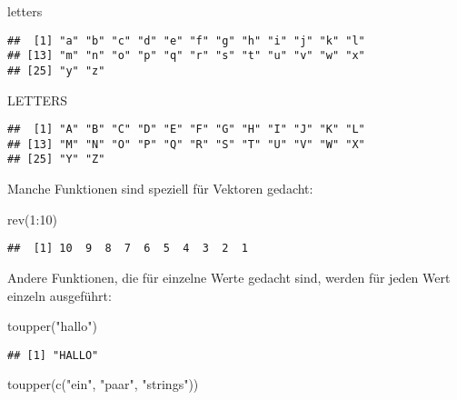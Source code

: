 \documentclass[11pt,german,a4paper]{article}
\newenvironment{Shaded}{\begin{snugshade}}{\end{snugshade}}
\newcommand{\DecValTok}[1]{\textcolor[rgb]{0.00,0.00,0.81}{#1}}
\newcommand{\FunctionTok}[1]{\textcolor[rgb]{0.00,0.00,0.00}{#1}}
\newcommand{\NormalTok}[1]{#1}
\newcommand{\SpecialCharTok}[1]{\textcolor[rgb]{0.00,0.00,0.00}{#1}}
\newcommand{\StringTok}[1]{\textcolor[rgb]{0.31,0.60,0.02}{#1}}
\begin{document}
\begin{Shaded}
\begin{Highlighting}[]
\NormalTok{letters}
\end{Highlighting}
\end{Shaded}

\begin{verbatim}
##  [1] "a" "b" "c" "d" "e" "f" "g" "h" "i" "j" "k" "l"
## [13] "m" "n" "o" "p" "q" "r" "s" "t" "u" "v" "w" "x"
## [25] "y" "z"
\end{verbatim}

\begin{Shaded}
\begin{Highlighting}[]
\NormalTok{LETTERS}
\end{Highlighting}
\end{Shaded}

\begin{verbatim}
##  [1] "A" "B" "C" "D" "E" "F" "G" "H" "I" "J" "K" "L"
## [13] "M" "N" "O" "P" "Q" "R" "S" "T" "U" "V" "W" "X"
## [25] "Y" "Z"
\end{verbatim}

Manche Funktionen sind speziell für Vektoren gedacht:

\begin{Shaded}
\begin{Highlighting}[]
\FunctionTok{rev}\NormalTok{(}\DecValTok{1}\SpecialCharTok{:}\DecValTok{10}\NormalTok{)}
\end{Highlighting}
\end{Shaded}

\begin{verbatim}
##  [1] 10  9  8  7  6  5  4  3  2  1
\end{verbatim}

Andere Funktionen, die für einzelne Werte gedacht sind, werden für jeden Wert einzeln ausgeführt:

\begin{Shaded}
\begin{Highlighting}[]
\FunctionTok{toupper}\NormalTok{(}\StringTok{"hallo"}\NormalTok{)}
\end{Highlighting}
\end{Shaded}

\begin{verbatim}
## [1] "HALLO"
\end{verbatim}

\begin{Shaded}
\begin{Highlighting}[]
\FunctionTok{toupper}\NormalTok{(}\FunctionTok{c}\NormalTok{(}\StringTok{"ein"}\NormalTok{, }\StringTok{"paar"}\NormalTok{, }\StringTok{"strings"}\NormalTok{))}
\end{Highlighting}
\end{Shaded}
\end{document}
